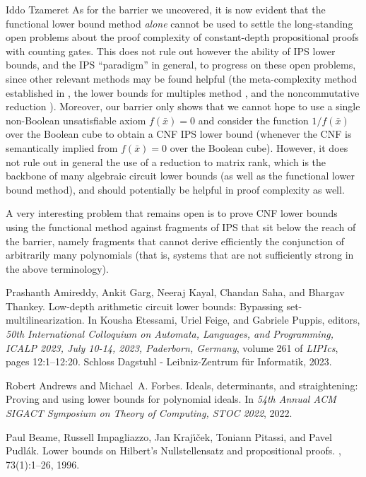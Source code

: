 \documentclass[report]{owrart}
\begin{document}
\begin{report}
\begin{talk}{Iddo Tzameret}
As for the barrier we uncovered, it is now evident that the functional lower bound method \emph{alone} cannot be used to settle the long-standing open problems about the proof complexity of  constant-depth propositional proofs with counting gates. This does not rule out however the ability of IPS lower bounds, and the IPS ``paradigm''  in general, to progress on these open problems, since  other relevant methods may be found helpful (the meta-complexity method established in \cite{ST21}, the lower bounds for multiples method \cite{FSTW21,AF22}, and the noncommutative reduction \cite{LTW18}). Moreover, our barrier only shows that we cannot hope to use
a single non-Boolean unsatisfiable axiom $f(\bar{x})=0$ and 
consider the function ${1}/{f(\bar{x})}$ over the Boolean cube
to obtain a CNF IPS lower bound (whenever the CNF is semantically
implied from $f(\bar{x})=0$ over the Boolean cube). However, it does not rule out in
general the use of a reduction to matrix rank, which is the backbone
of many algebraic circuit lower bounds (as well as the functional lower bound method), and should potentially be
helpful in proof complexity as well.

A very interesting  problem that remains open is to prove CNF lower bounds using the functional method against
fragments of IPS that sit below the reach of the barrier, namely fragments
that cannot derive efficiently the conjunction of arbitrarily 
many polynomials (that is, systems that are not sufficiently strong
in the above terminology). 


\begin{thebibliography}{99}
        
Prashanth Amireddy, Ankit Garg, Neeraj Kayal, Chandan Saha, and Bhargav
  Thankey.
\newblock Low-depth arithmetic circuit lower bounds: Bypassing
  set-multilinearization.
\newblock In Kousha Etessami, Uriel Feige, and Gabriele Puppis, editors, {\em
  50th International Colloquium on Automata, Languages, and Programming,
  {ICALP} 2023, July 10-14, 2023, Paderborn, Germany}, volume 261 of {\em
  LIPIcs}, pages 12:1--12:20. Schloss Dagstuhl - Leibniz-Zentrum f{\"{u}}r
  Informatik, 2023.

Robert Andrews and Michael~A. Forbes.
\newblock Ideals, determinants, and straightening: Proving and using lower
  bounds for polynomial ideals.
\newblock In {\em 54th Annual {ACM} {SIGACT} Symposium on Theory of Computing,
  {STOC} 2022}, 2022.

Paul Beame, Russell Impagliazzo, Jan Kraj{\'{\i}}{\v{c}}ek, Toniann Pitassi,
  and Pavel Pudl{\'a}k.
\newblock Lower bounds on {H}ilbert's {N}ullstellensatz and propositional
  proofs.
, 73(1):1--26, 1996.


\end{thebibliography}
\end{talk}
\end{report}
\end{document}
